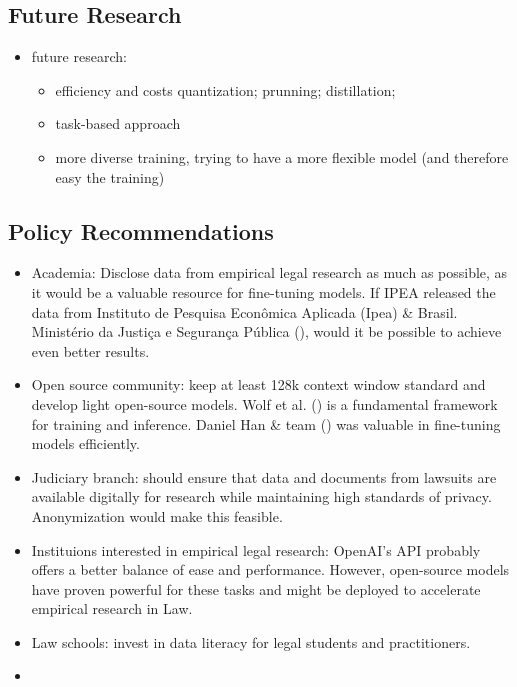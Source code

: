 \documentclass[
  12pt,
]{article}
\providecommand{\tightlist}{%
  \setlength{\itemsep}{0pt}\setlength{\parskip}{0pt}}\usepackage{longtable,booktabs,array}
\begin{document}
\subsection{Future Research}\label{sec-future-research}

\begin{itemize}
\tightlist
\item
  future research:

  \begin{itemize}
  \tightlist
  \item
    efficiency and costs quantization; prunning; distillation;
  \item
    task-based approach
  \item
    more diverse training, trying to have a more flexible model (and
    therefore easy the training)
  \end{itemize}
\end{itemize}

\subsection{Policy Recommendations}\label{sec-policy-recommendations}

\begin{itemize}
\item
  Academia: Disclose data from empirical legal research as much as
  possible, as it would be a valuable resource for fine-tuning models.
  If IPEA released the data from Instituto de Pesquisa Econômica
  Aplicada (Ipea) \& Brasil. Ministério da Justiça e Segurança Pública
  (),
  would it be possible to achieve even better results.
\item
  Open source community: keep at least 128k context window standard and
  develop light open-source models. Wolf et al.
  () is a fundamental
  framework for training and inference. Daniel Han \& team
  () was valuable in
  fine-tuning models efficiently.
\item
  Judiciary branch: should ensure that data and documents from lawsuits
  are available digitally for research while maintaining high standards
  of privacy. Anonymization would make this feasible.
\item
  Instituions interested in empirical legal research: OpenAI's API
  probably offers a better balance of ease and performance. However,
  open-source models have proven powerful for these tasks and might be
  deployed to accelerate empirical research in Law.
\item
  Law schools: invest in data literacy for legal students and
  practitioners.
\item
\end{itemize}
\end{document}
